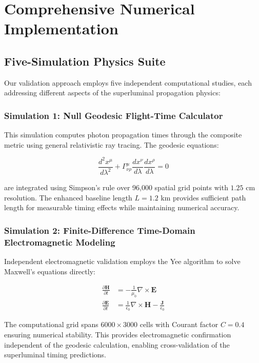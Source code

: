 \documentclass[aps,prl,reprint,groupedaddress,floatfix]{revtex4-1}
\begin{document}
\section{Comprehensive Numerical Implementation}

\subsection{Five-Simulation Physics Suite}

Our validation approach employs five independent computational studies, each addressing different aspects of the superluminal propagation physics:

\subsubsection{Simulation 1: Null Geodesic Flight-Time Calculator}

This simulation computes photon propagation times through the composite metric using general relativistic ray tracing. The geodesic equations:

\begin{equation}
\frac{d^2 x^\mu}{d\lambda^2} + \Gamma^\mu_{\nu\rho} \frac{dx^\nu}{d\lambda} \frac{dx^\rho}{d\lambda} = 0 \label{eq:geodesic}
\end{equation}

are integrated using Simpson's rule over 96,000 spatial grid points with $1.25$ cm resolution. The enhanced baseline length $L = 1.2$ km provides sufficient path length for measurable timing effects while maintaining numerical accuracy.

\subsubsection{Simulation 2: Finite-Difference Time-Domain Electromagnetic Modeling}

Independent electromagnetic validation employs the Yee algorithm to solve Maxwell's equations directly:

\begin{align}
\frac{\partial \mathbf{H}}{\partial t} &= -\frac{1}{\mu_0} \nabla \times \mathbf{E} \label{eq:maxwell_h} \\
\frac{\partial \mathbf{E}}{\partial t} &= \frac{1}{\epsilon_0} \nabla \times \mathbf{H} - \frac{\mathbf{J}}{\epsilon_0} \label{eq:maxwell_e}
\end{align}

The computational grid spans $6000 \times 3000$ cells with Courant factor $C = 0.4$ ensuring numerical stability. This provides electromagnetic confirmation independent of the geodesic calculation, enabling cross-validation of the superluminal timing predictions.
\end{document}
